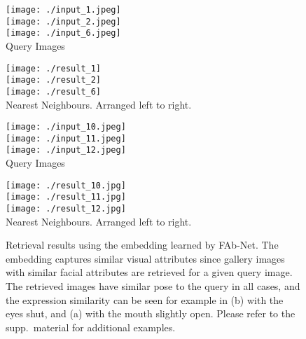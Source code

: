 \documentclass{bmvc2k}
\def\networkname{FAb-Net}
\begin{document}
\begin{figure*}[t]
\begin{minipage}[t][1\width]{0.15\textwidth}\centering
\scriptsize
\raisebox{0.4cm}{(a)} {\texttt{[image: ./input\_1.jpeg]}} \\ \vspace{.5em}
\raisebox{0.4cm}{(b)} {\texttt{[image: ./input\_2.jpeg]}} \\ \vspace{1em}
\raisebox{0.4cm}{(c)} {\texttt{[image: ./input\_6.jpeg]}} \\ 
{      Query Images}
\end{minipage}
\begin{minipage}[t][1\width]{0.33\textwidth}\centering
\scriptsize
{\texttt{[image: ./result\_1]}} \\ \vspace{.5em}
{\texttt{[image: ./result\_2]}} \\ \vspace{1em}
{\texttt{[image: ./result\_6]}} \\
Nearest Neighbours. Arranged left to right.
\end{minipage}
\begin{minipage}[t][1\width]{0.15\textwidth}\centering
\scriptsize
\raisebox{0.4cm}{(d)} {\texttt{[image: ./input\_10.jpeg]}} \\ \vspace{.5em}
\raisebox{0.4cm}{(e)} {\texttt{[image: ./input\_11.jpeg]}} \\ \vspace{1em}
\raisebox{0.4cm}{(f)} {\texttt{[image: ./input\_12.jpeg]}} \\ 
{      Query Images}
\end{minipage}
\begin{minipage}[t][1\width]{0.33\textwidth}\centering
\scriptsize
{\texttt{[image: ./result\_10.jpg]}} \\ \vspace{.5em}
{\texttt{[image: ./result\_11.jpg]}} \\ \vspace{1em}
{\texttt{[image: ./result\_12.jpg]}} \\
Nearest Neighbours. Arranged left to right.
\end{minipage}
\caption{Retrieval results using the embedding learned by \networkname. The embedding captures similar visual attributes since gallery images with similar facial attributes are retrieved for a given query image.
The retrieved images have similar pose to the query in all cases, and
the expression similarity can be seen for example in (b) 
with the eyes shut, and (a) with the  mouth slightly open. Please refer to the supp.~material for additional examples.}
\label{fig:retrievalexamples}
\end{figure*}
\end{document}
